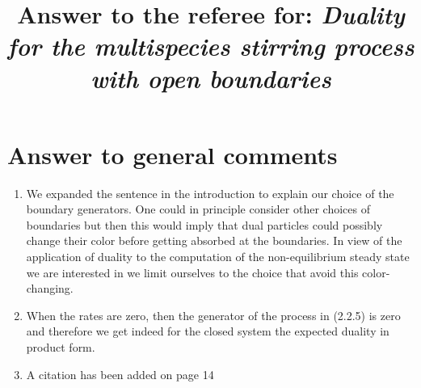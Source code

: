 \documentclass[10pt]{article}
\title{Answer to the referee for: \textit{Duality for the multispecies stirring process with open boundaries}}
\numberwithin{equation}{section}
\numberwithin{equation}{subsection}
\newcommand{\fra}[1]{\textcolor[rgb]{0,0,1}{#1}}
\begin{document}
		\maketitle
		\section*{Answer to general comments}
		\begin{enumerate}
			\item%
				We expanded the sentence in the introduction to explain our choice of the boundary generators. One could in principle consider other choices of boundaries but then this would imply that dual particles could possibly change their color before getting absorbed at the boundaries. In view of the application of duality to the computation of the non-equilibrium steady state we are interested in we limit ourselves to the choice that avoid this color-changing.
				\item%
					When the rates are zero, then the generator of the process in (2.2.5) is zero and therefore we get indeed for the closed system the expected duality in product form.
					\item %
						A citation has been added on page 14

\end{enumerate}
\end{document}
